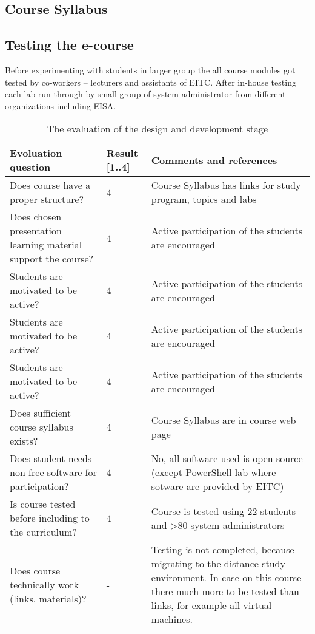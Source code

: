 \subsection{Course Syllabus}
\label{Course Syllabus}


\subsection{Testing the e-course}
Before experimenting with students in larger group the all course modules got tested by co-workers -- lecturers and assistants of \gls{EITC}. After in-house testing each lab run-through by small group of system administrator from different organizations including \gls{EISA}.


\begin{table}[h]
\centering
\caption{The evaluation of the design and development stage }
{ \small 
\begin{tabular}{|p{6cm}|p{2cm}|p{5cm}|}
\hline 
\color{blue} Evoluation question & \color{blue} Result [1..4] & \color{blue} Comments and references \\
\hline
Does course have a proper structure? 
& 4  &  Course Syllabus has links for study program, topics and labs  \\ 
\hline
Does chosen presentation learning material support the course? 
& 4  &  Active participation of the students are encouraged \\ 
\hline
Students are motivated to be active? 
& 4  &  Active participation of the students are encouraged \\ 
\hline
Students are motivated to be active? 
& 4  &  Active participation of the students are encouraged \\ 
\hline
Students are motivated to be active? 
& 4  &  Active participation of the students are encouraged \\ 
\hline
Does sufficient course syllabus exists? 
& 4  &  Course Syllabus are in course web page \\ 
\hline 
Does student needs non-free software for participation?
& 4 &  No, all software used is open source (except PowerShell lab where sotware are provided by \gls{EITC}) \\ 
\hline 
Is course tested before including to the curriculum?
& 4 & Course is tested using 22 students and >80 system administrators \\ 
\hline
Does course technically work (links, materials)?
& - & Testing is not completed, because migrating to the distance study environment. In case on this course there much more to be tested than links, for example all virtual machines.\\ 
\hline 
\end{tabular} 
}
\label{table:desing_develop_evaluation}
\end{table}


